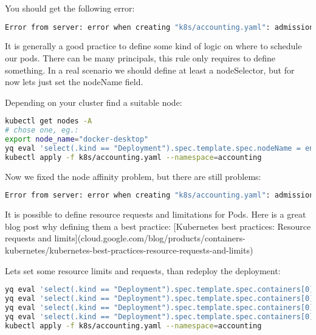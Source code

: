 You should get the following error:

\begin{lstlisting}[caption={TODO},language=bash,label=code:todo]
Error from server: error when creating "k8s/accounting.yaml": admission webhook "node-affinity.btieger.me" denied the request: Deployment must have some kind of node affinity! (affinity, nodeSelector, nodeName)
\end{lstlisting}

It is generally a good practice to define some kind of logic on where to schedule our pods. There can be many principals, this rule only requires to define something. In a real scenario we should define at least a nodeSelector, but for now lets just set the nodeName field.

Depending on your cluster find a suitable node:

\begin{lstlisting}[caption={TODO},language=bash,label=code:bashx]
kubectl get nodes -A
# chose one, eg.:
export node_name="docker-desktop"
yq eval 'select(.kind == "Deployment").spec.template.spec.nodeName = env(node_name)' k8s/accounting.yaml -i
kubectl apply -f k8s/accounting.yaml --namespace=accounting
\end{lstlisting}

Now we fixed the node affinity problem, but there are still problems:

\begin{lstlisting}[caption={TODO},language=bash,label=code:todo]
Error from server: error when creating "k8s/accounting.yaml": admission webhook "deny-no-resources.btieger.me" denied the request: Deployment must have resource definitions!
\end{lstlisting}

It is possible to define resource requests and limitations for Pods. Here is a great blog post why defining them a best practice: [Kubernetes best practices: Resource requests and limits](cloud.google.com/blog/products/containers-kubernetes/kubernetes-best-practices-resource-requests-and-limits)

Lets set some resource limits and requests, than redeploy the deployment:

\begin{lstlisting}[caption={TODO},language=bash,label=code:bashx]
yq eval 'select(.kind == "Deployment").spec.template.spec.containers[0].resources.limits.cpu = "500m"' k8s/accounting.yaml -i
yq eval 'select(.kind == "Deployment").spec.template.spec.containers[0].resources.limits.memory = "128Mi"' k8s/accounting.yaml -i
yq eval 'select(.kind == "Deployment").spec.template.spec.containers[0].resources.requests.cpu = "500m"' k8s/accounting.yaml -i
yq eval 'select(.kind == "Deployment").spec.template.spec.containers[0].resources.requests.memory = "128Mi"' k8s/accounting.yaml -i
kubectl apply -f k8s/accounting.yaml --namespace=accounting
\end{lstlisting}

